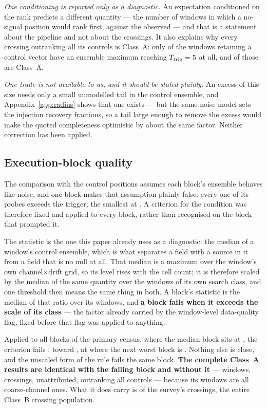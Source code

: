 \emph{One conditioning is reported only as a diagnostic.} An expectation
conditioned on the rank predicts a different quantity --- the number of
windows in which a no-signal position would rank first, \ClustStageMean{}
against the \ClustStageNObs{} observed --- and that is a statement about the
pipeline and not about the crossings. It also explains why every crossing
outranking all its controls is Class~A: only \StageNullEligible{} of the
\StageNullAllWin{} windows retaining a control vector have an ensemble
maximum reaching $T_{\rm trig}=5$ at all, and
\StageNullEligibleA{} of those are Class~A.

\emph{One trade is not available to us, and it should be stated plainly.} An
excess of this size needs only a small unmodelled tail in the control
ensemble, and Appendix~\ref{app:radius} shows that one exists --- but the
same noise model sets the injection recovery fractions, so a tail large
enough to remove the excess would make the quoted completeness optimistic by
about the same factor. Neither correction has been applied.

\subsection{Execution-block quality}
\label{sec:blockquality}

The comparison with the control positions assumes each block's ensemble
behaves like noise, and one block makes that assumption plainly false: every
one of its \NCtrl{} probes exceeds the trigger, the smallest at
\BqFailCtrlMin. A criterion for the condition was therefore fixed and applied
to every block, rather than recognised on the block that prompted it.

The statistic is the one this paper already uses as a diagnostic: the median
of a window's control ensemble, which is what separates a field with a source
in it from a field that is no null at all. That median is a maximum over the
window's own channel$\times$drift grid, so its level rises with the cell
count; it is therefore scaled by the median of the same quantity over the
windows of its own search class, and one threshold then means the same thing
in both. A block's statistic is the median of that ratio over its windows,
and \textbf{a block fails when it exceeds \BqFactor{} the scale of its
class} --- the factor already carried by the window-level data-quality flag,
fixed before that flag was applied to anything.

Applied to all \BqNBlocks{} blocks of the primary census, where the median
block sits at \BqQMed, the criterion fails \BqNFail: \BqFailBlock{} toward
\BqFailStar, at \BqFailQ{} where the next worst block is \BqNextQ. Nothing
else is close, and the unscaled form of the rule fails the same
\BqRawNFail{} block. \textbf{The complete Class~A results are identical with
the failing block and without it} --- \BqWinA{} windows, \BqXrossA{}
crossings, \BqUnattrA{} unattributed, \BqRankA{} outranking all \NCtrl{}
controls --- because its \BqFailNWin{} windows are all coarse-channel ones.
What it does carry is \BqFailNCross{} of the survey's \NCross{} crossings,
the entire Class~B crossing population.

